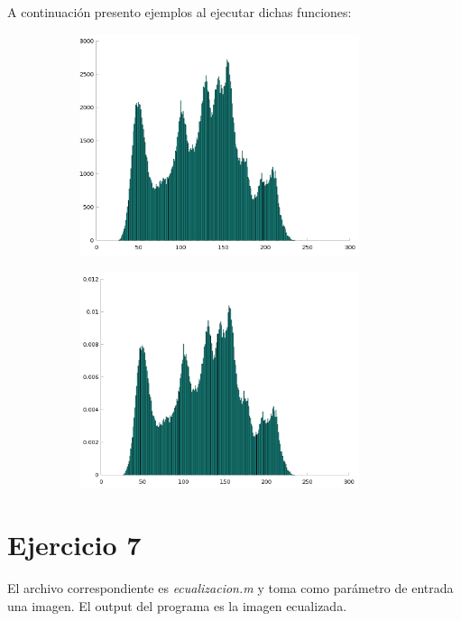 \documentclass{article}
\begin{document}
A continuación presento ejemplos al ejecutar dichas funciones:

\begin{figure}[H]
    \begin{subfigure}{0.5\textwidth}
        \includegraphics[width=0.9\textwidth]{histoLena.png} %
    \end{subfigure}\hfill
    \begin{subfigure}{0.5\textwidth}
        \includegraphics[width=0.9\textwidth]{histoNormalizadoLena.png} %
    \end{subfigure}
\end{figure}

\section*{Ejercicio 7}
El archivo correspondiente es \textit{ecualizacion.m} y toma como parámetro de entrada una imagen. El output del programa es la imagen ecualizada. 
\end{document}
